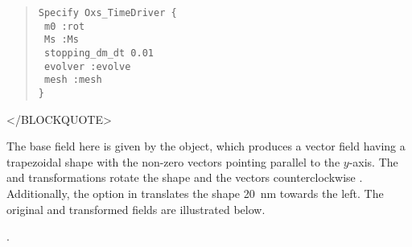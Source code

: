 \begin{description}
\begin{quote}
\begin{verbatim}
Specify Oxs_TimeDriver {
 m0 :rot
 Ms :Ms
 stopping_dm_dt 0.01
 evolver :evolve
 mesh :mesh
}
\end{verbatim}
\end{quote}
\begin{rawhtml}
</BLOCKQUOTE>
\end{rawhtml}
The base field here is given by the 
object, which produces a vector field having a trapezoidal shape with
the non-zero vectors pointing parallel to the $y$-axis.  The
 and  transformations rotate the shape and the
vectors counterclockwise .
Additionally, the  option in  translates the
shape 20~nm towards the left.  The original and transformed fields are
illustrated below.
%

\begin{ExampleMifs}[Example]
  .
\end{ExampleMifs}


\end{description}
